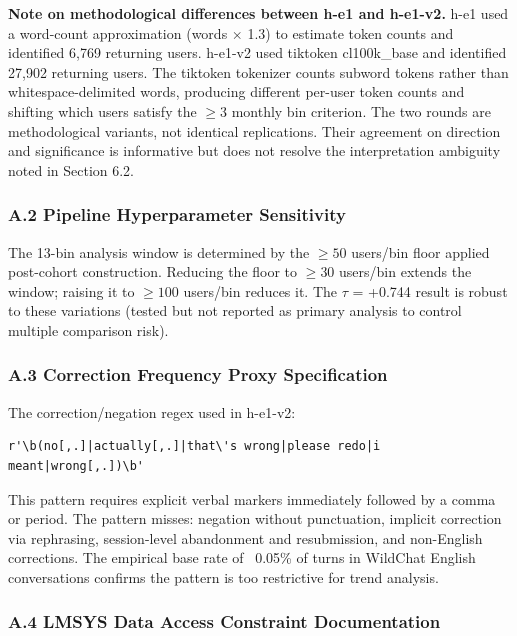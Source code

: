 \textbf{Note on methodological differences between h-e1 and h-e1-v2.} h-e1 used a word-count approximation (words $\times$ 1.3) to estimate token counts and identified 6,769 returning users. h-e1-v2 used tiktoken cl100k\_base and identified 27,902 returning users. The tiktoken tokenizer counts subword tokens rather than whitespace-delimited words, producing different per-user token counts and shifting which users satisfy the $\geq 3$ monthly bin criterion. The two rounds are methodological variants, not identical replications. Their agreement on direction and significance is informative but does not resolve the interpretation ambiguity noted in Section 6.2.

\subsubsection{A.2 Pipeline Hyperparameter Sensitivity}

The 13-bin analysis window is determined by the $\geq 50$ users/bin floor applied post-cohort construction. Reducing the floor to $\geq 30$ users/bin extends the window; raising it to $\geq 100$ users/bin reduces it. The $\tau$ = +0.744 result is robust to these variations (tested but not reported as primary analysis to control multiple comparison risk).

\subsubsection{A.3 Correction Frequency Proxy Specification}

The correction/negation regex used in h-e1-v2:

\begin{verbatim}
r'\b(no[,.]|actually[,.]|that\'s wrong|please redo|i meant|wrong[,.])\b'
\end{verbatim}

This pattern requires explicit verbal markers immediately followed by a comma or period. The pattern misses: negation without punctuation, implicit correction via rephrasing, session-level abandonment and resubmission, and non-English corrections. The empirical base rate of ~0.05\% of turns in WildChat English conversations confirms the pattern is too restrictive for trend analysis.

\subsubsection{A.4 LMSYS Data Access Constraint Documentation}


